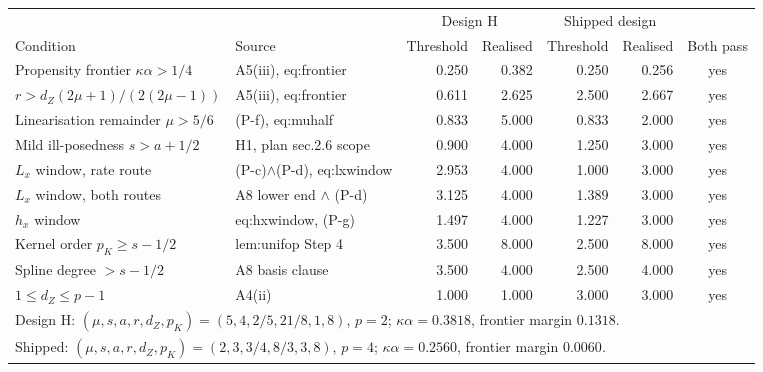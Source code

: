\begin{tabular}{llrrrrc}
\toprule
 & & \multicolumn{2}{c}{Design H} & \multicolumn{2}{c}{Shipped design} & \\
\cmidrule(lr){3-4}\cmidrule(lr){5-6}
Condition & Source & Threshold & Realised & Threshold & Realised & Both pass \\
\midrule
Propensity frontier $\kappa\alpha>1/4$ & A5(iii), eq:frontier & 0.250 & 0.382 & 0.250 & 0.256 & yes \\
$r>d_Z(2\mu+1)/(2(2\mu-1))$ & A5(iii), eq:frontier & 0.611 & 2.625 & 2.500 & 2.667 & yes \\
Linearisation remainder $\mu>5/6$ & (P-f), eq:muhalf & 0.833 & 5.000 & 0.833 & 2.000 & yes \\
Mild ill-posedness $s>a+1/2$ & H1, plan sec.2.6 scope & 0.900 & 4.000 & 1.250 & 3.000 & yes \\
$L_x$ window, rate route & (P-c)$\wedge$(P-d), eq:lxwindow & 2.953 & 4.000 & 1.000 & 3.000 & yes \\
$L_x$ window, both routes & A8 lower end $\wedge$ (P-d) & 3.125 & 4.000 & 1.389 & 3.000 & yes \\
$h_x$ window & eq:hxwindow, (P-g) & 1.497 & 4.000 & 1.227 & 3.000 & yes \\
Kernel order $p_K\ge s-1/2$ & lem:unifop Step 4 & 3.500 & 8.000 & 2.500 & 8.000 & yes \\
Spline degree $>s-1/2$ & A8 basis clause & 3.500 & 4.000 & 2.500 & 4.000 & yes \\
$1\le d_Z\le p-1$ & A4(ii) & 1.000 & 1.000 & 3.000 & 3.000 & yes \\
\midrule
\multicolumn{7}{l}{Design H: $(\mu,s,a,r,d_Z,p_K)=(5,4,2/5,21/8,1,8)$, $p=2$; $\kappa\alpha=0.3818$, frontier margin $0.1318$.} \\
\multicolumn{7}{l}{Shipped: $(\mu,s,a,r,d_Z,p_K)=(2,3,3/4,8/3,3,8)$, $p=4$; $\kappa\alpha=0.2560$, frontier margin $0.0060$.} \\
\bottomrule
\end{tabular}
